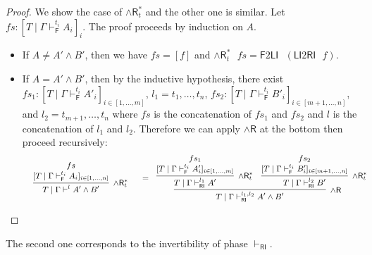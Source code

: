\documentclass[submission,copyright,creativecommons]{eptcs}
\theoremstyle{definition}
\newcommand{\andr}{\land \mathsf{R}}
\newcommand{\RI}{\mathsf{RI}}
\newcommand{\LI}{\mathsf{LI}}
\newcommand{\F}{\mathsf{F}}
\newcommand{\proofbox}[1]{\begin{tabular}{l} #1 \end{tabular}}
\begin{document}
\begin{proof}
  We show the case of $\andr^{*}_{t}$ and the other one is similar.
  Let $fs : [T \mid \Gamma \vdash^{t_i}_{\F} A_i]_i$. The proof proceeds by induction on $A$.
  \begin{itemize}
    \item If $A \neq A' \land B'$, then we have $fs = [ f ]$ and $\andr^*_{t} \text{ } fs = \F 2 \LI \text{ } (\LI 2 \RI \text{ } f)$.
    \item If $A = A' \land B'$, then by the inductive hypothesis, there exist $fs_1 : [T \mid \Gamma \vdash^{t_i}_{\F} A'_i]_{i \in [1 , \dots , m]}$, $l_1 = t_1 , \dots , t_n$, $fs_2 : [T \mid \Gamma \vdash^{t_i}_{\F} B'_i]_{i \in [m+1 , \dots , n]}$, and $l_2 = t_{m+1} , \dots , t_n$ where $fs$ is the concatenation of $fs_1$ and $fs_2$ and $l$ is the concatenation of $l_1 $ and $l_2$.
    Therefore we can apply $\andr$ at the bottom then proceed recursively:
    \begin{displaymath}
      \small
      \begin{array}{cc}
        \proofbox{
        \infer[\andr^*_{t}]{T \mid \Gamma \vdash^{l} A' \land B'}{
          \deduce{[T \mid \Gamma \vdash^{t_i}_{\F} A_i]_{i \in [1 , \dots , n]}}{fs}
        }
        }
        &
        =
        \proofbox{
        \infer[\andr]{T \mid \Gamma \vdash^{l_1 , l_2}_{\RI} A' \land B'}{
          \infer[\andr^{*}_{t}]{T \mid \Gamma \vdash^{l_1}_{\RI} A'}{
            \deduce{[T \mid \Gamma \vdash^{t_i}_{\F} A'_i]_{i \in [1 , \dots , m]}}{fs_1}
          }
          &
          \infer[\andr^{*}_{t}]{T \mid \Gamma \vdash^{l_2}_{\RI} B'}{
            \deduce{[T \mid \Gamma \vdash^{t_i}_{\F} B'_i]_{i \in [m+1 , \dots , n]}}{fs_2}
          }
        }
       }
      \end{array}
    \end{displaymath}
  \end{itemize}
\end{proof}

The second one corresponds to the invertibility of phase $\vdash_\RI$.
\end{document}
